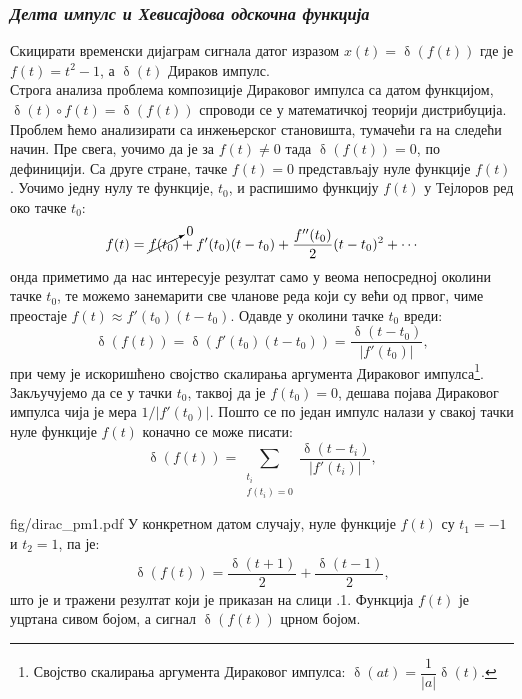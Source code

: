 \subsubsection{\textit{Делта импулс и Хевисајдова одскочна функција}}
\noindent
\PID 
Скицирати временски дијаграм сигнала датог изразом $x(t) = \updelta(f(t))$ где је 
$f(t) = t^2 - 1$, а
$\updelta(t)$ Дираков импулс. \\[2mm]

\RESENJE  
Строга анализа проблема композиције Дираковог импулса са датом функцијом, $\updelta(t) \circ f(t) = \updelta(f(t))$ 
спроводи се у математичкој теорији дистрибуција. Проблем ћемо анализирати са инжењерског становишта, 
тумачећи га на следећи начин. Пре свега, уочимо да је за $f(t) \neq 0$ тада $\updelta(f(t)) = 0$, по дефиницији.    
Са друге стране, тачке $f(t) = 0$ представљају нуле функције $f(t)$. Уочимо једну нулу те функције, $t_0$, и распишимо
функцију $f(t)$ у Тејлоров ред око тачке $t_0$:
\begin{eqnarray}
    f(t) = \cancelto{0}{f(t_0)} + f'(t_0) (t-t_0) + \dfrac{f''(t_0)}{2} (t-t_0)^2 + \cdots
\end{eqnarray}
онда приметимо да нас интересује резултат само у веома непосредној околини тачке $t_0$, те можемо занемарити све
чланове реда који су већи од првог, чиме преостаје $f(t) \approx f'(t_0) (t-t_0)$. Одавде у околини тачке 
$t_0$ вреди: 
\begin{equation}
    \updelta(f(t)) = \updelta(f'(t_0) (t-t_0)) = \dfrac{\updelta(t-t_0)}{|f'(t_0)|},
\end{equation}
при чему је искоришћено својство скалирања аргумента Дираковог импулса\footnote{Својство скалирања аргумента Дираковог импулса:
$\updelta(at) = \dfrac{1}{|a|} \updelta(t)$.}.
Закључујемо да се у тачки $t_0$, таквој да је $f(t_0) = 0$, дешава појава Дираковог импулса чија је мера $1/|f'(t_0)|$.
Пошто се по један импулс налази у свакој тачки нуле функције $f(t)$ коначно се може писати:
\begin{equation}
    \updelta(f(t)) = \sum_{\substack{t_i \\[0.5mm] f(t_i)=0}} \dfrac{\updelta(t-t_i)}{|f'(t_i)|},
\end{equation}

\begin{slikaDesno}{fig/dirac_pm1.pdf}
У конкретном датом случају, нуле функције $f(t)$ су ${t_1 = -1}$ и {$t_2 = 1$}, па је:
\begin{eqnarray}
    \updelta(f(t)) = \dfrac{\updelta(t+1)}{2} + \dfrac{\updelta(t-1)}{2},
\end{eqnarray}
што је и тражени резултат који је приказан на слици \ID.1.
Функција $f(t)$ је уцртана сивом бојом, а сигнал $\updelta(f(t))$ црном бојом.

\end{slikaDesno}